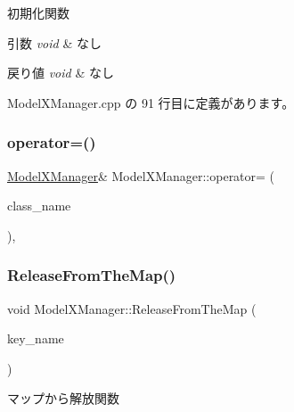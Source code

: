 初期化関数 


\begin{DoxyParams}{引数}
{\em void} & なし \\
\hline
\end{DoxyParams}

\begin{DoxyRetVals}{戻り値}
{\em void} & なし \\
\hline
\end{DoxyRetVals}


 Model\+X\+Manager.\+cpp の 91 行目に定義があります。

\mbox{\label{class_model_x_manager_adc65f6b4b9b06b4a20923245606175d8}} 
\subsubsection{\texorpdfstring{operator=()}{operator=()}}
{\footnotesize\ttfamily \mbox{\hyperlink{class_model_x_manager}{Model\+X\+Manager}}\& Model\+X\+Manager\+::operator= (\begin{DoxyParamCaption}\item[{const \mbox{\hyperlink{class_model_x_manager}{Model\+X\+Manager}} \&}]{class\+\_\+name }\end{DoxyParamCaption})\hspace{0.3cm}{\ttfamily [private]}, {\ttfamily [delete]}}

\mbox{\label{class_model_x_manager_ab7182ee338b307e32c26f110bb651c4b}} 
\subsubsection{\texorpdfstring{Release\+From\+The\+Map()}{ReleaseFromTheMap()}}
{\footnotesize\ttfamily void Model\+X\+Manager\+::\+Release\+From\+The\+Map (\begin{DoxyParamCaption}\item[{std\+::string $\ast$}]{key\+\_\+name }\end{DoxyParamCaption})}



マップから解放関数 


